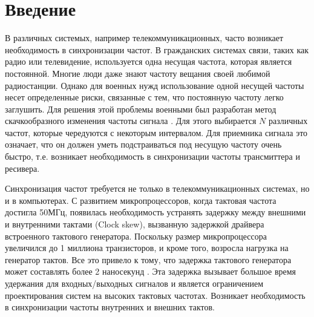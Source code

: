 \documentclass[a4paper,article,14pt]{extarticle}
\begin{document}




 
\tableofcontents



\pagebreak
\section{Введение}
В различных системых, например телекоммуникационных, часто возникает необходимость в синхронизации частот. В гражданских системах связи, таких как радио или телевидение, используется одна несущая частота, которая является постоянной. Многие люди даже знают частоту вещания своей любимой радиостанции. Однако для военных нужд использование одной несущей частоты несет определенные риски, связанные с тем, что постоянную частоту легко заглушить. Для решения этой проблемы военными был разработан метод скачкообразного изменения частоты сигнала \cite{ghulam}. Для этого выбирается $N$ различных частот, которые чередуются с некоторым интервалом. Для приемника сигнала это означает, что он должен уметь подстраиваться под несущую частоту очень быстро, т.е. возникает необходимость в синхронизации частоты трансмиттера и ресивера. 

Синхронизация частот требуется не только в телекоммуникационных системах, но и в компьютерах. С развитием микропроцессоров, когда тактовая частота достигла 50МГц, появилась необходимость устранять задержку между внешними и внутренними тактами (Clock skew), вызванную задержкой драйвера встроенного тактового генератора. Поскольку размер микропроцессора увеличился до 1 миллиона транзисторов, и кроме того, возросла нагрузка на генератор тактов. Все это привело к тому, что задержка тактового генератора может составлять более 2 наносекунд \cite{Microprocessors}. Эта задержка вызывает большое время удержания для входных/выходных сигналов и является ограничением проектирования систем на высоких тактовых частотах. Возникает необходимость в синхронизации частоты внутренних и внешних тактов. 
\end{document}

